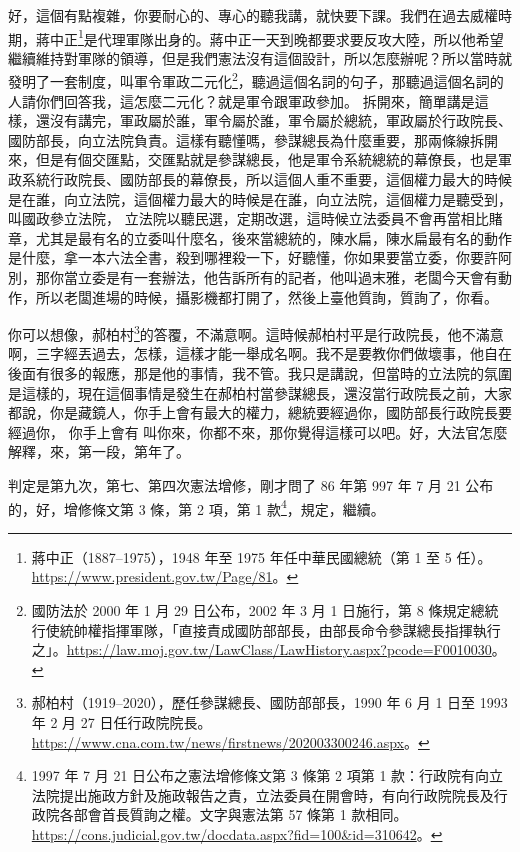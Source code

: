 \hypertarget{c08:cue:187}{}好，這個有點複雜，你要耐心的、專心的聽我講，就快要下課。我們在過去威權時期，蔣中正\footnote{蔣中正（1887–1975），1948 年至 1975 年任中華民國總統（第 1 至 5 任）。\url{https://www.president.gov.tw/Page/81}。}是代理軍隊出身的。蔣中正一天到晚都要求要反攻大陸，所以他希望繼續維持對軍隊的領導，但是我們憲法沒有這個設計，所以怎麼辦呢？所以當時就發明了一套制度，叫軍令軍政二元化\footnote{國防法於 2000 年 1 月 29 日公布，2002 年 3 月 1 日施行，第 8 條規定總統行使統帥權指揮軍隊，「直接責成國防部部長，由部長命令參謀總長指揮執行之」。\url{https://law.moj.gov.tw/LawClass/LawHistory.aspx?pcode=F0010030}。}，聽過這個名詞的句子，那聽過這個名詞的人請你們回答我，這怎麼二元化？就是軍令跟軍政參加。
\hypertarget{c08:cue:188}{}拆開來，簡單講是這樣，還沒有講完，軍政屬於誰，軍令屬於誰，軍令屬於總統，軍政屬於行政院長、國防部長，向立法院負責。這樣有聽懂嗎，參謀總長為什麼重要，那兩條線拆開來，但是有個交匯點，交匯點就是參謀總長，他是軍令系統總統的幕僚長，也是軍政系統行政院長、國防部長的幕僚長，所以這個人重不重要，這個權力最大的時候是在誰，向立法院，這個權力最大的時候是在誰，向立法院，這個權力是聽受到，叫國政參立法院，
\hypertarget{c08:cue:189}{}立法院以聽民選，定期改選，這時候立法委員不會再當相比賭章，尤其是最有名的立委叫什麼名，後來當總統的，陳水扁，陳水扁最有名的動作是什麼，拿一本六法全書，殺到哪裡殺一下，好聽懂，你如果要當立委，你要許阿別，那你當立委是有一套辦法，他告訴所有的記者，他叫過末雅，老闆今天會有動作，所以老闆進場的時候，攝影機都打開了，然後上臺他質詢，質詢了，你看。

\hypertarget{c08:cue:190}{}你可以想像，郝柏村\footnote{郝柏村（1919–2020），歷任參謀總長、國防部部長，1990 年 6 月 1 日至 1993 年 2 月 27 日任行政院院長。\url{https://www.cna.com.tw/news/firstnews/202003300246.aspx}。}的答覆，不滿意啊。這時候郝柏村平是行政院長，他不滿意啊，三字經丟過去，怎樣，這樣才能一舉成名啊。我不是要教你們做壞事，他自在後面有很多的報應，那是他的事情，我不管。我只是講說，但當時的立法院的氛圍是這樣的，現在這個事情是發生在郝柏村當參謀總長，還沒當行政院長之前，大家都說，你是藏鏡人，你手上會有最大的權力，總統要經過你，國防部長行政院長要經過你，
\hypertarget{c08:cue:191}{}你手上會有 叫你來，你都不來，那你覺得這樣可以吧。好，大法官怎麼解釋，來，第一段，第年了。

\hypertarget{c08:cue:192}{}判定是第九次，第七、第四次憲法增修，剛才問了 86 年第 997 年 7 月 21 公布的，好，增修條文第 3 條，第 2 項，第 1 款\footnote{1997 年 7 月 21 日公布之憲法增修條文第 3 條第 2 項第 1 款：行政院有向立法院提出施政方針及施政報告之責，立法委員在開會時，有向行政院院長及行政院各部會首長質詢之權。文字與憲法第 57 條第 1 款相同。\url{https://cons.judicial.gov.tw/docdata.aspx?fid=100&id=310642}。}，規定，繼續。

